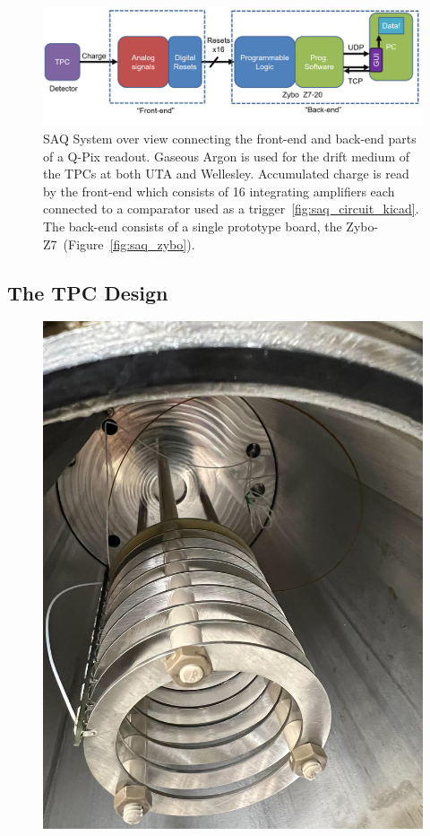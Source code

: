 \begin{figure}[]
\centering
\includegraphics[width=\textwidth]{images/saq_daq_back-end_summary.png}
\caption{SAQ System over view connecting the front-end and back-end parts of a Q-Pix readout.
Gaseous Argon is used for the drift medium of the TPCs at both UTA and Wellesley.
Accumulated charge is read by the front-end which consists of 16 integrating amplifiers each connected to a comparator used as a trigger~\ref{fig:saq_circuit_kicad}.
The back-end consists of a single prototype board, the Zybo-Z7~(Figure~\ref{fig:saq_zybo}).
}
\label{fig:saq_diagram}
\end{figure}


\subsection{The TPC Design}

\begin{figure}[]
\centering
\includegraphics[width=\textwidth]{images/saq_fieldcase_rings.jpg}
\caption{}
\label{fig:saq_field_case}
\end{figure}


